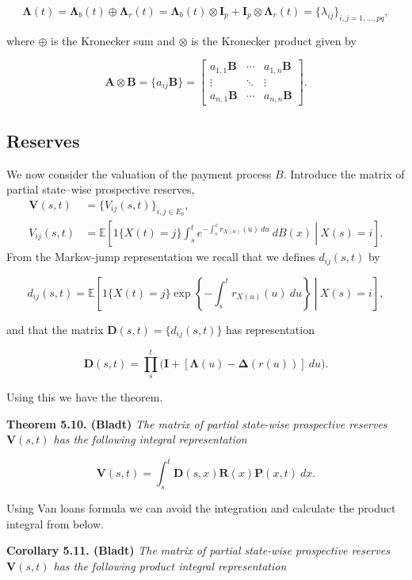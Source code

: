 \documentclass[a4paper,12pt,openany]{book}
\begin{document}
\[
\mathbf \Lambda(t)=\mathbf \Lambda_b(t)\oplus \mathbf\Lambda_r(t)=\mathbf \Lambda_b(t)\otimes \mathbf I_p+\mathbf I_p \otimes \mathbf \Lambda_r(t)=\{\lambda_{ij}\}_{i,j=1,...,pq},
\]

where \(\oplus\) is the Kronecker sum and \(\otimes\) is the Kronecker product given by

\[
\mathbf A\otimes \mathbf B=\{a_{ij}\mathbf B\}=\begin{bmatrix}
a_{1,1}\mathbf B & \cdots & a_{1,n}\mathbf B\\
\vdots & \ddots & \vdots\\
a_{n,1}\mathbf B & \cdots & a_{n,n}\mathbf B
\end{bmatrix}.
\]

\hypertarget{reserves}{%
\subsection{Reserves}\label{reserves}}

We now consider the valuation of the payment process \(B\). Introduce the matrix of partial state--wise prospective reserves,
\begin{align*}
\mathbf V(s,t)&=\{V_{ij}(s,t)\}_{i,j\in E_b},\\
V_{ij}(s,t)&=\mathbb E\left[\left.1\{X(t)=j\}\int_s^te^{-\int_s^xr_{X(u)}(u)\ du}\ dB(x) \ \right\vert\ X(s)=i\right].
\end{align*}
From the Markov-jump representation we recall that we defines \(d_{ij}(s,t)\) by

\[
d_{ij}(s,t)=\mathbb E\left[\left.1\{X(t)=j\}\exp\left\{-\int_s^tr_{X(u)}(u)\ du\right\} \ \right\vert\ X(s)=i\right],
\]

and that the matrix \(\mathbf D(s,t)=\{d_{ij}(s,t)\}\) has representation

\[
\mathbf D(s,t)=\prod_s^t\Big(\mathbf I+[\mathbf \Lambda(u)-\mathbf\Delta (r(u))]\ du\Big).
\]

Using this we have the theorem.

\textbf{Theorem 5.10. (Bladt)} \emph{The matrix of partial state-wise prospective reserves \(\mathbf V(s,t)\) has the following integral representation}

\[
\mathbf V(s,t)=\int_s^t\mathbf D(s,x)\mathbf R(x)\mathbf P(x,t)\ dx.
\]

Using Van loans formula we can avoid the integration and calculate the product integral from below.

\textbf{Corollary 5.11. (Bladt)} \emph{The matrix of partial state-wise prospective reserves \(\mathbf V(s,t)\) has the following product integral representation}
\end{document}
